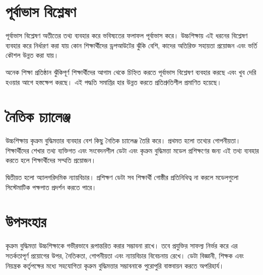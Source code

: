 \documentclass[
    language=bengali,
    doctype=article,
]{../../omnilatex}
\begin{document}
\section{পূর্বাভাস বিশ্লেষণ}
পূর্বাভাস বিশ্লেষণ অতীতের তথ্য ব্যবহার করে ভবিষ্যতের ফলাফল পূর্বাভাস করে। উচ্চশিক্ষায় এই ধরনের বিশ্লেষণ ব্যবহার করে নির্ধারণ করা যায় কোন শিক্ষার্থীদের ড্রপআউটের ঝুঁকি বেশি, কাদের অতিরিক্ত সহায়তা প্রয়োজন এবং ভর্তি কৌশল উন্নত করা যায়।

অনেক শিক্ষা প্রতিষ্ঠান ঝুঁকিপূর্ণ শিক্ষার্থীদের আগাম থেকে চিহ্নিত করতে পূর্বাভাস বিশ্লেষণ ব্যবহার করছে এবং খুব দেরি হওয়ার আগে হস্তক্ষেপ করছে। এই পদ্ধতি সমাপ্তির হার উন্নত করতে প্রতিশ্রুতিশীল প্রমাণিত হয়েছে।

\section{নৈতিক চ্যালেঞ্জ}
উচ্চশিক্ষায় কৃত্রুম বুদ্ধিমত্তার ব্যবহার বেশ কিছু নৈতিক চ্যালেঞ্জ তৈরি করে। প্রথমত হলো তথ্যের গোপনীয়তা। শিক্ষার্থীদের শেখার তথ্য ব্যক্তিগত এবং সংবেদনশীল ডেটা এবং কৃত্রুম বুদ্ধিমত্তা মডেল প্রশিক্ষণের জন্য এই তথ্য ব্যবহার করতে হলে শিক্ষার্থীদের সম্মতি প্রয়োজন।

দ্বিতীয়ত হলো অ্যালগরিদমিক ন্যায়বিচার। প্রশিক্ষণ ডেটা সব শিক্ষার্থী গোষ্ঠীর প্রতিনিধিত্ব না করলে মডেলগুলো সিস্টেমাটিক পক্ষপাত প্রদর্শন করতে পারে।

\section{উপসংহার}
কৃত্রুম বুদ্ধিমত্তা উচ্চশিক্ষাকে গভীরভাবে রূপান্তরিত করার সম্ভাবনা রাখে। তবে প্রযুক্তির সাফল্য নির্ভর করে এর সতর্কতাপূর্ণ প্রয়োগের উপর, নৈতিকতা, গোপনীয়তা এবং ন্যায়বিচার বিবেচনায় রেখে। ডেটা বিজ্ঞানী, শিক্ষক এবং নিয়ন্ত্রক কর্তৃপক্ষের মধ্যে সহযোগিতা কৃত্রুম বুদ্ধিমত্তার সম্ভাবনাকে পুরোপুরি বাস্তবায়ন করতে অপরিহার্য।
\end{document}
